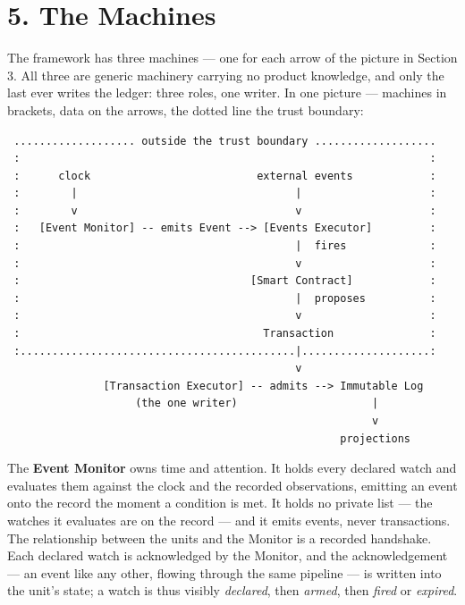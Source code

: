 \documentclass[11pt,a4paper]{article}
\newcommand{\clabel}[1]{\leavevmode\hypertarget{clause-#1}{}%
  \marginpar{\raggedright\scriptsize\ttfamily\textcolor{gray}{#1}}}
\begin{document}
\hypertarget{the-machines}{%
\section{5. The Machines}\label{the-machines}}

\clabel{C-5.1}The framework has three machines --- one for each arrow of the picture
in Section 3. All three are generic machinery carrying no product
knowledge, and only the last ever writes the ledger: three roles, one
writer. In one picture --- machines in brackets, data on the arrows, the
dotted line the trust boundary:

\begin{verbatim}
 ................... outside the trust boundary ...................
 :                                                                :
 :      clock                          external events            :
 :        |                                  |                    :
 :        v                                  v                    :
 :   [Event Monitor] -- emits Event --> [Events Executor]         :
 :                                           |  fires             :
 :                                           v                    :
 :                                    [Smart Contract]            :
 :                                           |  proposes          :
 :                                           v                    :
 :                                      Transaction               :
 :...........................................|....................:
                                             v
               [Transaction Executor] -- admits --> Immutable Log
                    (the one writer)                     |
                                                         v
                                                    projections
\end{verbatim}

\clabel{C-5.2}The \textbf{Event Monitor} owns time and attention. It holds every
declared watch and evaluates them against the clock and the recorded
observations, emitting an event onto the record the moment a condition
is met. It holds no private list --- the watches it evaluates are on the
record --- and it emits events, never transactions. The relationship
between the units and the Monitor is a recorded handshake. Each declared
watch is acknowledged by the Monitor, and the acknowledgement --- an
event like any other, flowing through the same pipeline --- is written
into the unit's state; a watch is thus visibly \emph{declared}, then
\emph{armed}, then \emph{fired} or \emph{expired}.
\end{document}
